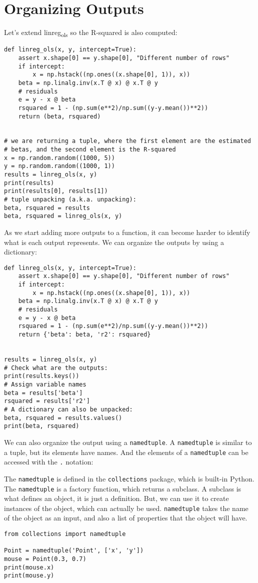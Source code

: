 \documentclass[12pt, a4paper]{article}
\begin{document}
\section{Organizing Outputs}
\label{sec:org95d1bbd}
Let's extend linreg\textsubscript{ols} so the R-squared is also computed:
\lstset{language=jupyter-python,label= ,caption= ,captionpos=b,numbers=none}
\begin{lstlisting}
def linreg_ols(x, y, intercept=True):
    assert x.shape[0] == y.shape[0], "Different number of rows"
    if intercept:
        x = np.hstack((np.ones((x.shape[0], 1)), x))
    beta = np.linalg.inv(x.T @ x) @ x.T @ y
    # residuals
    e = y - x @ beta
    rsquared = 1 - (np.sum(e**2)/np.sum((y-y.mean())**2))
    return (beta, rsquared)


# we are returning a tuple, where the first element are the estimated
# betas, and the second element is the R-squared
x = np.random.random((1000, 5))
y = np.random.random((1000, 1))
results = linreg_ols(x, y)
print(results)
print(results[0], results[1])
# tuple unpacking (a.k.a. unpacking):
beta, rsquared = results
beta, rsquared = linreg_ols(x, y)
\end{lstlisting}

As we start adding more outputs to a function, it can become harder to identify what is each output represents.
We can organize the outputs by using a dictionary:
\lstset{language=jupyter-python,label= ,caption= ,captionpos=b,numbers=none}
\begin{lstlisting}
def linreg_ols(x, y, intercept=True):
    assert x.shape[0] == y.shape[0], "Different number of rows"
    if intercept:
        x = np.hstack((np.ones((x.shape[0], 1)), x))
    beta = np.linalg.inv(x.T @ x) @ x.T @ y
    # residuals
    e = y - x @ beta
    rsquared = 1 - (np.sum(e**2)/np.sum((y-y.mean())**2))
    return {'beta': beta, 'r2': rsquared}


results = linreg_ols(x, y)
# Check what are the outputs:
print(results.keys())
# Assign variable names
beta = results['beta']
rsquared = results['r2']
# A dictionary can also be unpacked:
beta, rsquared = results.values()
print(beta, rsquared)
\end{lstlisting}

We can also organize the output using a \texttt{namedtuple}.
A \texttt{namedtuple} is similar to a tuple, but its elements have names.
And the elements of a \texttt{namedtuple} can be accessed with the \texttt{.} notation:

The \texttt{namedtuple} is defined in the \texttt{collections} package, which is built-in Python.
The \texttt{namedtuple} is a factory function, which returns a subclass.
A subclass is what defines an object, it is just a definition.
But, we can use it to create instances of the object, which can actually be used.
\texttt{namedtuple} takes the name of the object as an input, and also a list of properties that the object will have.
\lstset{language=jupyter-python,label= ,caption= ,captionpos=b,numbers=none}
\begin{lstlisting}
from collections import namedtuple

Point = namedtuple('Point', ['x', 'y'])
mouse = Point(0.3, 0.7)
print(mouse.x)
print(mouse.y)
\end{lstlisting}
\end{document}
